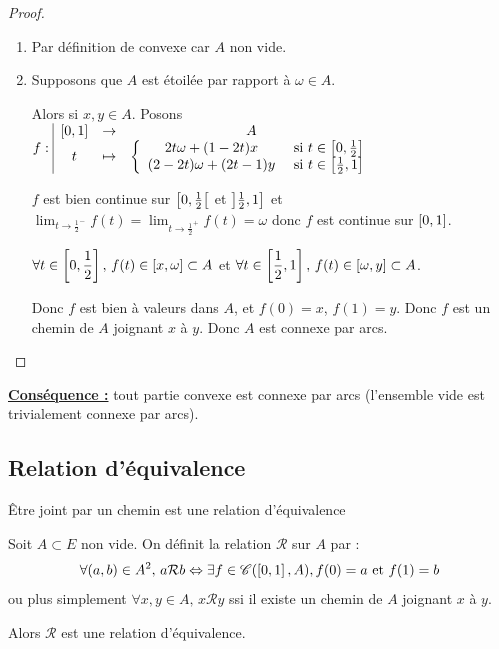 \begin{proof}~
    \begin{enumerate}
        \item Par définition de convexe car $A$ non vide. 

        \item Supposons que $A$ est étoilée par rapport à $\omega \in A$.

        Alors si $x, y \in A$. Posons $f: \space \begin{array}{|ccc}
        \left[0, 1\right] & \to & A \\
        t & \mapsto & \left\{ \begin{array}{cc}
            2t \omega + (1 - 2t)x & \text{ si } t \in \left[0, \frac 1 2\right] \\
            (2 - 2t) \omega + (2t - 1)y & \text{ si } t \in \left[\frac 1 2, 1\right]        
        \end{array} \right.
        \end{array}$

        $f$ est bien continue sur $\left[0, \frac 1 2\right[$ et $\left]\frac 1 2, 1\right]$ et 
        $\displaystyle \lim_{t \to \frac 1 2^-} f(t) = \lim_{t \to \frac 1 2^+} f(t) = \omega$ donc $f$ est continue sur $\left[0, 1\right]$.

        $\displaystyle \forall t \in \left[0, \frac 1 2\right], \, f(t) \in \left[x, \omega\right] \subset A$ et
        $\displaystyle \forall t \in \left[\frac 1 2, 1\right], \, f(t) \in \left[\omega, y\right] \subset A$.

        Donc $f$ est bien à valeurs dans $A$, et $f(0) = x$, $f(1) = y$. 
        Donc $f$ est un chemin de $A$ joignant $x$ à $y$. Donc $A$ est connexe par arcs.
    \end{enumerate}
\end{proof}

\textbf{\uline{Conséquence :}} tout partie convexe est connexe par arcs (l'ensemble vide est trivialement connexe par arcs).

\subsection{Relation d'équivalence}

\begin{theoreme}{Être joint par un chemin est une relation d'équivalence}{}

    Soit $A \subset E$ non vide.
    On définit la relation $\mathcal R$ sur $A$ par : 
    \[\forall (a, b) \in A^2, \, a \mathcal R b \Leftrightarrow \exists f \in \mathscr C(\left[0, 1\right], A), f(0) = a \text{ et } f(1) = b\]
    ou plus simplement $\forall x, y \in A, \, x \mathcal R y$ ssi il existe un chemin de $A$ joignant $x$ à $y$.
    
    Alors $\mathcal R$ est une relation d'équivalence.
\end{theoreme}

